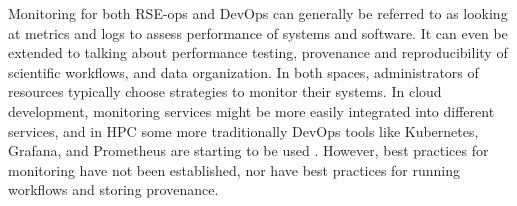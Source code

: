Monitoring for both RSE-ops and DevOps can generally be referred to as looking at metrics and logs to assess performance of systems and software. It can even be extended to talking about performance testing, provenance and reproducibility of scientific workflows, and data organization. In both spaces, administrators of resources typically choose strategies to monitor their systems. In cloud development, monitoring services might be more easily integrated into different services, and in HPC some more traditionally DevOps tools like Kubernetes, Grafana, and Prometheus are starting to be used \cite{k8}. However, best practices for monitoring have not been established, nor have best practices for running workflows and storing provenance.
